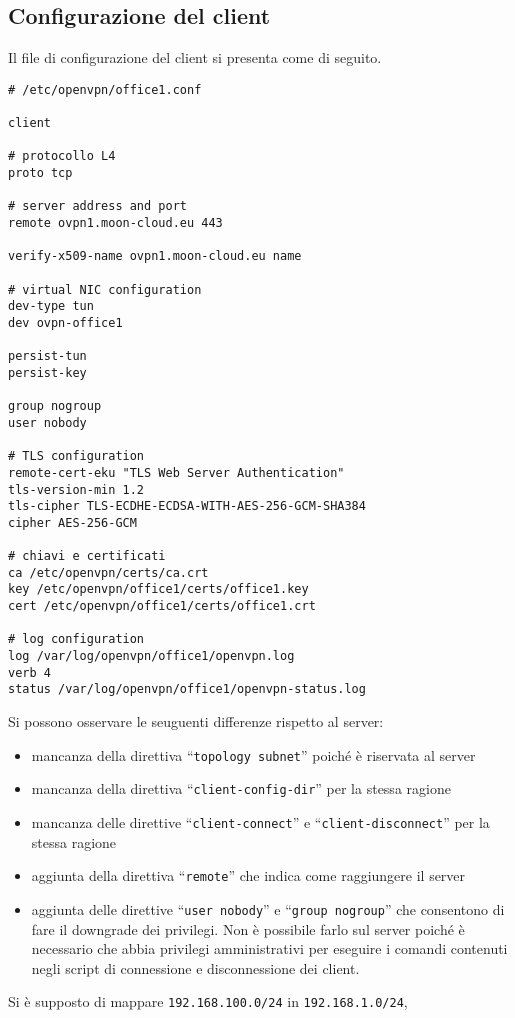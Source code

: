 \subsection{Configurazione del client}
Il file di configurazione del client si presenta come di seguito.
\begin{verbatim}
# /etc/openvpn/office1.conf

client

# protocollo L4
proto tcp

# server address and port
remote ovpn1.moon-cloud.eu 443

verify-x509-name ovpn1.moon-cloud.eu name

# virtual NIC configuration
dev-type tun
dev ovpn-office1

persist-tun
persist-key

group nogroup
user nobody

# TLS configuration
remote-cert-eku "TLS Web Server Authentication"
tls-version-min 1.2
tls-cipher TLS-ECDHE-ECDSA-WITH-AES-256-GCM-SHA384
cipher AES-256-GCM

# chiavi e certificati
ca /etc/openvpn/certs/ca.crt
key /etc/openvpn/office1/certs/office1.key
cert /etc/openvpn/office1/certs/office1.crt

# log configuration
log /var/log/openvpn/office1/openvpn.log
verb 4
status /var/log/openvpn/office1/openvpn-status.log
\end{verbatim}
Si possono osservare le seuguenti differenze rispetto al server:
\begin{itemize}
  \item mancanza della direttiva ``\texttt{topology subnet}'' poiché è
  riservata al server
  \item mancanza della direttiva ``\texttt{client-config-dir}'' per la stessa
  ragione
  \item mancanza delle direttive ``\texttt{client-connect}'' e
  ``\texttt{client-disconnect}'' per la stessa ragione
  \item aggiunta della direttiva ``\texttt{remote}'' che indica come raggiungere
  il server
  \item aggiunta delle direttive ``\texttt{user nobody}'' e ``\texttt{group nogroup}''
  che consentono di fare il downgrade dei privilegi. Non è possibile farlo sul
  server poiché è necessario che abbia privilegi amministrativi per eseguire i
  comandi contenuti negli script di connessione e disconnessione dei client.
\end{itemize}
Si è supposto di mappare \texttt{192.168.100.0/24} in \texttt{192.168.1.0/24},
